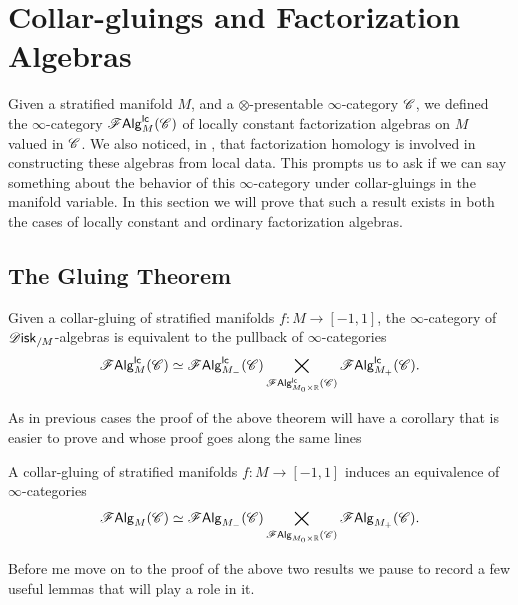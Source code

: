 \documentclass[../text]{subfiles}
\begin{document}
\section{Collar-gluings and Factorization Algebras}\label{ch:gluing_disk_alg}

Given a stratified manifold $M$, and a $\otimes$-presentable $\infty$-category $\mathscr{C}$, we defined the $\infty$-category $\mathscr{F} \mathsf{Alg}^{\mathsf{lc}}_M (\mathscr{C})$ of locally constant factorization algebras on $M$ valued in $\mathscr{C}$. We also noticed, in , that factorization homology is involved in constructing these algebras from local data. This prompts us to ask if we can say something about the behavior of this $\infty$-category under collar-gluings in the manifold variable. In this section we will prove that such a result exists in both the cases of locally constant and ordinary factorization algebras.


\subsection{The Gluing Theorem}

\begin{theorem}\label{thm:gluing_lcfas}
    Given a collar-gluing of stratified manifolds $f: M \rightarrow [-1,1]$, the $\infty$-category of $\disk_{/M}$-algebras is equivalent to the pullback of $\infty$-categories
    \begin{equation}
        \mathscr{F} \mathsf{Alg}^{\mathsf{lc}}_M (\mathscr{C}) \simeq \mathscr{F} \mathsf{Alg}^{\mathsf{lc}}_{M_-} (\mathscr{C}) \bigtimes_{\mathscr{F} \mathsf{Alg}^{\mathsf{lc}}_{M_0 \times \mathbb{R}} (\mathscr{C})} \mathscr{F} \mathsf{Alg}^{\mathsf{lc}}_{M_+}(\mathscr{C}).
    \end{equation}
\end{theorem}

As in previous cases the proof of the above theorem will have a corollary that is easier to prove and whose proof goes along the same lines

\begin{corollary}\label{cor:gluing_falgs}
    A collar-gluing of stratified manifolds $f: M \rightarrow [-1,1]$ induces an equivalence of $\infty$-categories
    \begin{equation}
        \mathscr{F} \mathsf{Alg}_M (\mathscr{C}) \simeq \mathscr{F} \mathsf{Alg}_{M_-} (\mathscr{C}) \bigtimes_{\mathscr{F} \mathsf{Alg}_{M_0 \times \mathbb{R}} (\mathscr{C})} \mathscr{F} \mathsf{Alg}_{M_+}(\mathscr{C}).
    \end{equation}
\end{corollary}

Before me move on to the proof of the above two results we pause to record a few useful lemmas that will play a role in it.
\end{document}
